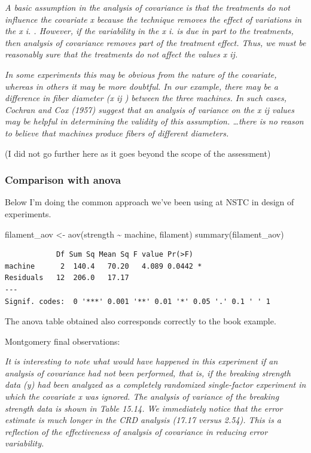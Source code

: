 \documentclass[
]{book}
\newenvironment{Shaded}{\begin{snugshade}}{\end{snugshade}}
\newcommand{\FunctionTok}[1]{\textcolor[rgb]{0.00,0.00,0.00}{#1}}
\newcommand{\NormalTok}[1]{#1}
\newcommand{\OtherTok}[1]{\textcolor[rgb]{0.56,0.35,0.01}{#1}}
\newcommand{\SpecialCharTok}[1]{\textcolor[rgb]{0.00,0.00,0.00}{#1}}
\begin{document}
\emph{A basic assumption in the analysis of covariance is that the treatments do not influence the covariate x because the technique removes the effect of variations in the x i. . However, if the variability in the x i. is due in part to the treatments, then analysis of covariance removes part of the treatment effect. Thus, we must be reasonably sure that the treatments do not affect the values x ij.}

\emph{In some experiments this may be obvious from the nature of the covariate, whereas in others it may be more doubtful. In our example, there may be a difference in fiber diameter (x ij ) between the three machines. In such cases, Cochran and Cox (1957) suggest that an analysis of variance on the x ij values may be helpful in determining the validity of this assumption. \ldots there is no reason to believe that machines produce fibers of different diameters.}

(I did not go further here as it goes beyond the scope of the assessment)

\hypertarget{comparison-with-anova}{%
\subsubsection{Comparison with anova}\label{comparison-with-anova}}

Below I'm doing the common approach we've been using at NSTC in design of experiments.

\begin{Shaded}
\begin{Highlighting}[]
\NormalTok{filament\_aov }\OtherTok{\textless{}{-}} \FunctionTok{aov}\NormalTok{(strength }\SpecialCharTok{\textasciitilde{}}\NormalTok{ machine, filament)}
\FunctionTok{summary}\NormalTok{(filament\_aov)}
\end{Highlighting}
\end{Shaded}

\begin{verbatim}
            Df Sum Sq Mean Sq F value Pr(>F)  
machine      2  140.4   70.20   4.089 0.0442 *
Residuals   12  206.0   17.17                 
---
Signif. codes:  0 '***' 0.001 '**' 0.01 '*' 0.05 '.' 0.1 ' ' 1
\end{verbatim}

The anova table obtained also corresponds correctly to the book example.

Montgomery final observations:

\emph{It is interesting to note what would have happened in this experiment if an analysis of covariance had not been performed, that is, if the breaking strength data (y) had been analyzed as a completely randomized single-factor experiment in which the covariate x was ignored. The analysis of variance of the breaking strength data is shown in Table 15.14. We immediately notice that the error estimate is much longer in the CRD analysis (17.17 versus 2.54). This is a reflection of the effectiveness of analysis of covariance in reducing error variability.}
\end{document}
